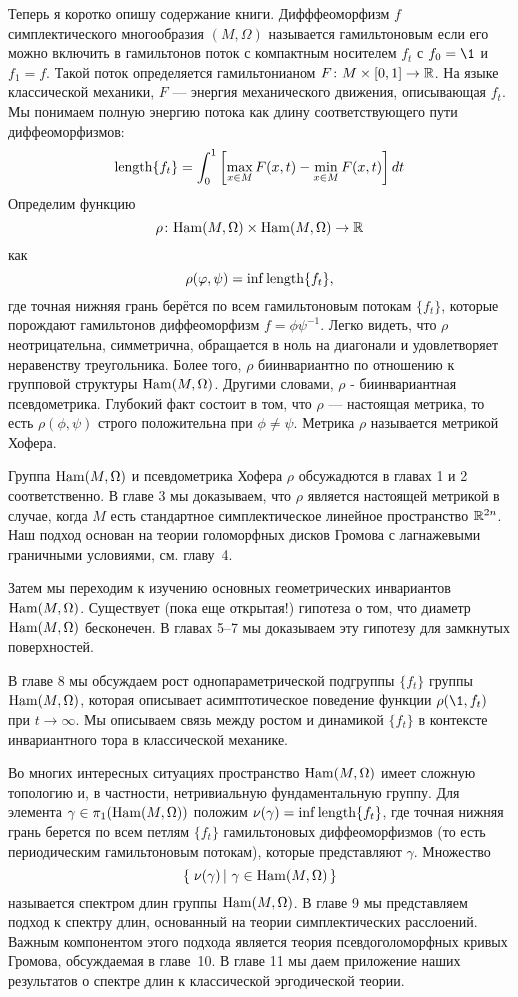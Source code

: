 Теперь я коротко опишу содержание книги.
Дифффеоморфизм $f$ симплектического многообразия $(M,\Omega)$ называется гамильтоновым если его можно включить в гамильтонов поток с компактным носителем $f_t$ с $f_0=\1$ и $f_1 =f$.
Такой поток определяется гамильтонианом $F\colon M \times [0, 1] \to \mathbb{R}$.
На языке классической механики, $F$ --- энергия механического движения, описывающая $f_t$.
Мы понимаем полную энергию потока как длину соответствующего пути диффеоморфизмов:
\[\textrm{length} \{f_t\} =
\int_0^1\left[\max_{x\in M}F(x,t)-\min_{x\in M}F(x,t)\right] dt 
\]%
Определим функцию
\[\rho\colon \mathrm{Ham}(M,\Omega) \times \mathrm{Ham}(M,\Omega) \to \mathbb{R}\]
как
\[\rho (\varphi, \psi) = \inf \textrm{length} \{f_t\},\]
где точная нижняя грань берётся по всем гамильтоновым потокам $\{f_t\}$, которые
порождают гамильтонов диффеоморфизм $f = \phi\psi^{-1}$.
Легко видеть, что $\rho$ неотрицательна, симметрична, обращается в ноль на диагонали и удовлетворяет неравенству треугольника.
Более того, $\rho$ биинвариантно по отношению к групповой структуры $\mathrm{Ham}(M,\Omega)$.
Другими словами, $\rho$ - биинвариантная псевдометрика.
Глубокий факт состоит в том, что $\rho$ --- настоящая метрика, то есть $\rho (\phi, \psi)$ строго положительна при $\phi \ne \psi$.
Метрика $\rho$ называется метрикой Хофера.

Группа $\mathrm{Ham}(M,\Omega)$ и псевдометрика Хофера $\rho$ обсужадются в главах 1 и 2 соответственно.
В главе 3 мы доказываем, что $\rho$ является настоящей метрикой в случае, когда $M$ есть стандартное симплектическое линейное пространство $\mathbb{R}^{2n}$.
Наш подход основан на теории голоморфных дисков Громова с лагнажевыми граничными условиями, см.
главу~4.

Затем мы переходим к изучению основных геометрических инвариантов $\mathrm{Ham}(M,\Omega)$.
Существует (пока еще открытая!) гипотеза о том, что диаметр $\mathrm{Ham}(M,\Omega)$ бесконечен.
В главах 5--7 мы доказываем эту гипотезу для замкнутых поверхностей.

В главе 8 мы обсуждаем рост однопараметрической подгруппы $\{f_t\}$ группы $\mathrm{Ham}(M,\Omega)$, которая описывает асимптотическое поведение функции $\rho (\1, f_t)$ при $t \to \infty$.
Мы описываем связь между ростом и динамикой $\{f_t\}$ в контексте инвариантного тора в классической механике.

Во многих интересных ситуациях пространство $\mathrm{Ham}(M,\Omega)$ имеет сложную топологию и, в частности, нетривиальную фундаментальную группу.
Для элемента $\gamma\in\pi_1(\mathrm{Ham}(M,\Omega))$ положим $\nu(\gamma) \z= \inf \length \{f_t\}$, где
точная нижняя грань берется по всем петлям $\{f_t\}$ гамильтоновых диффеоморфизмов (то есть периодическим гамильтоновым потокам), которые представляют $\gamma$.
Множество
\[\set{\nu(\gamma)}{\gamma\in\Ham(M,\Omega)}\]
называется спектром длин группы $\mathrm{Ham}(M,\Omega)$.
В главе 9 мы представляем подход к спектру длин, основанный на теории симплектических расслоений.
Важным компонентом этого подхода является теория псевдоголоморфных кривых Громова, обсуждаемая в главе~10.
В главе 11 мы даем приложение наших результатов о спектре длин к классической эргодической теории.

